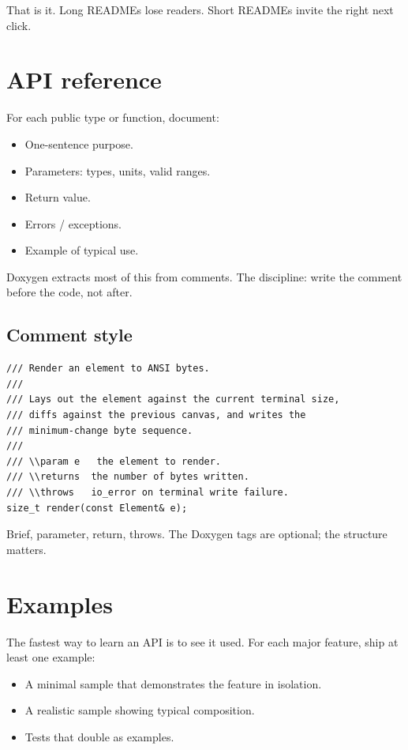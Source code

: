 That is it. Long READMEs lose readers. Short READMEs invite the
right next click.

\section{API reference}

For each public type or function, document:

\begin{itemize}[leftmargin=*]
  \item One-sentence purpose.
  \item Parameters: types, units, valid ranges.
  \item Return value.
  \item Errors / exceptions.
  \item Example of typical use.
\end{itemize}

Doxygen extracts most of this from comments. The discipline:
write the comment before the code, not after.

\subsection*{Comment style}

\begin{lstlisting}
/// Render an element to ANSI bytes.
///
/// Lays out the element against the current terminal size,
/// diffs against the previous canvas, and writes the
/// minimum-change byte sequence.
///
/// \\param e   the element to render.
/// \\returns  the number of bytes written.
/// \\throws   io_error on terminal write failure.
size_t render(const Element& e);
\end{lstlisting}

Brief, parameter, return, throws. The Doxygen tags are
optional; the structure matters.

\section{Examples}

The fastest way to learn an API is to see it used. For each
major feature, ship at least one example:

\begin{itemize}[leftmargin=*]
  \item A minimal sample that demonstrates the feature in
    isolation.
  \item A realistic sample showing typical composition.
  \item Tests that double as examples.
\end{itemize}

